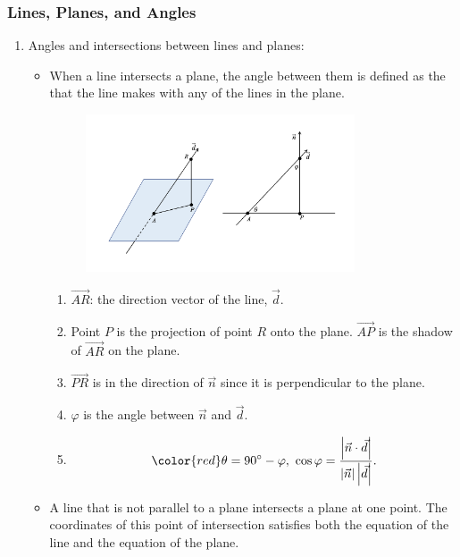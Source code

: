 \documentclass[12pt, a4paper]{article}
\begin{document}
\subsubsection{Lines, Planes, and Angles}
\begin{enumerate}
  \item Angles and intersections between lines and planes: 
  \begin{itemize}
    \item When a line intersects a plane, the angle between them is defined as the {\color{red}{smallest possible angle}} that the line makes with any of the lines in the plane. 
    \begin{figure}[H]
      \centering
      \includegraphics[width=0.8\textwidth]{Fig.3.14.jpg}
    \end{figure}
    \begin{enumerate}
      \item $\overrightarrow{AR}$: the direction vector of the line, $\vec{d}$.
      \item Point $P$ is the projection of point $R$ onto the plane. $\overrightarrow{AP}$ is the shadow of $\overrightarrow{AR}$ on the plane. 
      \item $\overrightarrow{PR}$ is in the direction of $\vec{n}$ since it is perpendicular to the plane. 
      \item $\varphi$ is the angle between $\vec{n}$ and $\vec{d}$. 
      \item $$\color{red} \theta=90^\circ-\varphi,\ \cos\varphi=\frac{\left|\vec{n}\cdot\vec{d}\right|}{\left|\vec{n}\right|\left|\vec{d}\right|}.$$
    \end{enumerate}
    \item A line that is not parallel to a plane intersects a plane at one point. The coordinates of this point of intersection satisfies both the equation of the line and the equation of the plane. 
  \end{itemize}

\end{enumerate}
\end{document}
